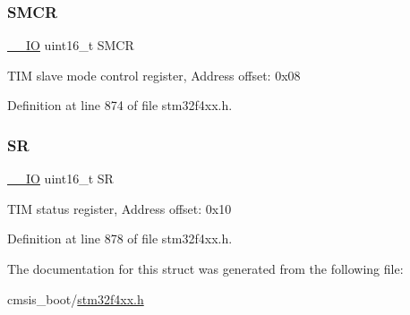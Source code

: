 \mbox{\label{struct_t_i_m___type_def_a02758713abfe580460dd5bcd8762702a}} 
\subsubsection{\texorpdfstring{S\+M\+CR}{SMCR}}
{\footnotesize\ttfamily \hyperlink{group___c_m_s_i_s__core__definitions_gaec43007d9998a0a0e01faede4133d6be}{\+\_\+\+\_\+\+IO} uint16\+\_\+t S\+M\+CR}

T\+IM slave mode control register, Address offset\+: 0x08 

Definition at line 874 of file stm32f4xx.\+h.

\mbox{\label{struct_t_i_m___type_def_a44962ea5442d203bf4954035d1bfeb9d}} 
\subsubsection{\texorpdfstring{SR}{SR}}
{\footnotesize\ttfamily \hyperlink{group___c_m_s_i_s__core__definitions_gaec43007d9998a0a0e01faede4133d6be}{\+\_\+\+\_\+\+IO} uint16\+\_\+t SR}

T\+IM status register, Address offset\+: 0x10 

Definition at line 878 of file stm32f4xx.\+h.



The documentation for this struct was generated from the following file\+:\begin{DoxyCompactItemize}
\item 
cmsis\+\_\+boot/\hyperlink{stm32f4xx_8h}{stm32f4xx.\+h}\end{DoxyCompactItemize}
